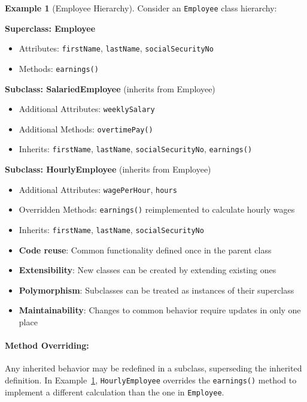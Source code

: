 \documentclass[11pt, a4paper, notitlepage]{report}
\theoremstyle{definition}
\theoremstyle{remark}
\theoremstyle{definition}
\newtheorem{example}[theorem]{Example}
\begin{document}
\begin{example}[Employee Hierarchy]
\label{ex:ch1-employee-inheritance}
Consider an \texttt{Employee} class hierarchy:

\textbf{Superclass: Employee}
\begin{itemize}
  \item Attributes: \texttt{firstName}, \texttt{lastName}, \texttt{socialSecurityNo}
  \item Methods: \texttt{earnings()}
\end{itemize}

\textbf{Subclass: SalariedEmployee} (inherits from Employee)
\begin{itemize}
  \item Additional Attributes: \texttt{weeklySalary}
  \item Additional Methods: \texttt{overtimePay()}
  \item Inherits: \texttt{firstName}, \texttt{lastName}, \texttt{socialSecurityNo}, \texttt{earnings()}
\end{itemize}

\textbf{Subclass: HourlyEmployee} (inherits from Employee)
\begin{itemize}
  \item Additional Attributes: \texttt{wagePerHour}, \texttt{hours}
  \item Overridden Methods: \texttt{earnings()}  reimplemented to calculate hourly wages
  \item Inherits: \texttt{firstName}, \texttt{lastName}, \texttt{socialSecurityNo}
\end{itemize}
\end{example}

\begin{keyresult}[title={Benefits of Inheritance}]
\begin{itemize}
  \item \textbf{Code reuse}: Common functionality defined once in the parent class
  \item \textbf{Extensibility}: New classes can be created by extending existing ones
  \item \textbf{Polymorphism}: Subclasses can be treated as instances of their superclass
  \item \textbf{Maintainability}: Changes to common behavior require updates in only one place
\end{itemize}
\end{keyresult}

\paragraph{Method Overriding:}
Any inherited behavior may be redefined in a subclass, superseding the inherited definition. In Example~\ref{ex:ch1-employee-inheritance}, \texttt{HourlyEmployee} overrides the \texttt{earnings()} method to implement a different calculation than the one in \texttt{Employee}.
\end{document}
